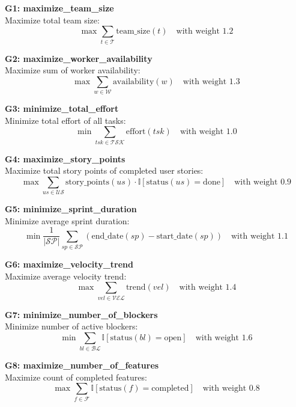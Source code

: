 \documentclass[12pt]{article}
\begin{document}
    \item \textbf{G1: maximize\_team\_size} \\
    Maximize total team size:
    \[
    \max \sum_{t \in \mathcal{T}} \text{team\_size}(t) \quad \text{with weight } 1.2
    \]

    \item \textbf{G2: maximize\_worker\_availability} \\
    Maximize sum of worker availability:
    \[
    \max \sum_{w \in \mathcal{W}} \text{availability}(w) \quad \text{with weight } 1.3
    \]

    \item \textbf{G3: minimize\_total\_effort} \\
    Minimize total effort of all tasks:
    \[
    \min \sum_{tsk \in \mathcal{TSK}} \text{effort}(tsk) \quad \text{with weight } 1.0
    \]

    \item \textbf{G4: maximize\_story\_points} \\
    Maximize total story points of completed user stories:
    \[
    \max \sum_{us \in \mathcal{US}} \text{story\_points}(us) \cdot \mathbb{I}[\text{status}(us) = \text{done}] \quad \text{with weight } 0.9
    \]

    \item \textbf{G5: minimize\_sprint\_duration} \\
    Minimize average sprint duration:
    \[
    \min \frac{1}{|\mathcal{SP}|} \sum_{sp \in \mathcal{SP}} (\text{end\_date}(sp) - \text{start\_date}(sp)) \quad \text{with weight } 1.1
    \]

    \item \textbf{G6: maximize\_velocity\_trend} \\
    Maximize average velocity trend:
    \[
    \max \sum_{vel \in \mathcal{VEL}} \text{trend}(vel) \quad \text{with weight } 1.4
    \]

    \item \textbf{G7: minimize\_number\_of\_blockers} \\
    Minimize number of active blockers:
    \[
    \min \sum_{bl \in \mathcal{BL}} \mathbb{I}[\text{status}(bl) = \text{open}] \quad \text{with weight } 1.6
    \]

    \item \textbf{G8: maximize\_number\_of\_features} \\
    Maximize count of completed features:
    \[
    \max \sum_{f \in \mathcal{F}} \mathbb{I}[\text{status}(f) = \text{completed}] \quad \text{with weight } 0.8
    \]
\end{document}
